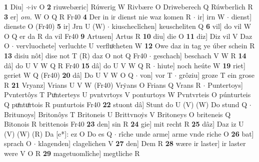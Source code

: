 \documentclass[8pt,a4paper,notitlepage]{article}
\begin{document}
\begin{table}[ht]
\begin{minipage}[t]{0.5\linewidth}
\textbf{1} Diu] ÷iv O \textbf{2} riuwebæric] Rúwerig W Rivbære O Driweberech Q Rúwberlich R \textbf{3} er] \textit{om.} W O Q R Fr40 \textbf{4} Der in ir dienst nie waz komen R  $\cdot$ ir] irn W  $\cdot$ dienst] dienste O (Fr40) \textbf{5} ir] Jrn U (W)  $\cdot$ kiuscheclîchen] keuscheliten Q \textbf{6} vil] do vil W O Q er da R da vil Fr40 \textbf{9} Artusen] Artus R \textbf{10} diu] die O \textbf{11} diz] Diz vil V Daz O  $\cdot$ vervluochete] verluchte U verfluͦcheten W \textbf{12} Owe daz in tag ye úber schein R \textbf{13} disiu nôt] dise not T (R) daz O not Q Fr40  $\cdot$ geschach] beschach V W R \textbf{14} dâ] do U V W Q R Fr40 \textbf{15} dâ] do U V W Q R  $\cdot$ hiute] noch heúte W \textbf{19} riet] geriet W Q (Fr40) \textbf{20} dâ] Do U V W O Q  $\cdot$ von] vor T  $\cdot$ grôziu] groze T ein grose R \textbf{21} Vryanz] Vrians U V W (Fr40) Vrẏans O Frians Q Vrans R  $\cdot$ Puntertoys] Pvntertôys T Puͦnterteys U pvntvrtoys V ponturtoys W Pvntvrteis O púnturteis Q puͦntuͦrtois R punturtois Fr40 \textbf{22} stuont dâ] Stunt do U (V) (W) Do stund Q  $\cdot$ Britunoys] Britonôys T Britoneis U Brittvnoẏs V Britoneys O briteneis Q Bitonois R brittenois Fr40 \textbf{23} den] sin R \textbf{24} gie] mit recht R \textbf{25} dâz] Daz iz U (V) (W) (R) Da [e*]: ez  O Do es Q  $\cdot$ rîche unde arme] arme vnde riche O \textbf{26} bat] sprach O  $\cdot$ klagenden] clagelichen V \textbf{27} den] Dem R \textbf{28} wære ir laster] ir laster were V O R \textbf{29} magetuomlîche] megtliche R \newline
\end{minipage}
\end{table}
\end{document}
